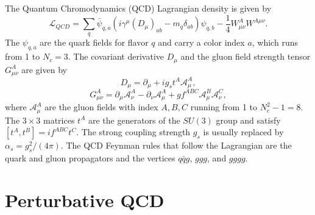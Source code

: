 The Quantum Chromodynamics (QCD) Lagrangian density is given by
%
\begin{equation}
\mathcal{L}_{QCD} =  \sum_q \bar{\psi}_{q,a} (i\gamma^{\mu} (D_{\mu})_{ab} - m_q \delta_{ab})\psi_{q,b} - \frac{1}{4} W^A_{\mu\nu}W^{A\mu\nu}. 
\end{equation}
%
The $\psi_{q,a}$ are the quark fields for flavor $q$ and carry a color index $a$, which runs from 1 to $N_c = 3$. The covariant derivative $D_{\mu}$ and the gluon field strength tensor $G^A_{\mu\nu}$ are given by
%
\begin{equation}
D_{\mu} = \partial_{\mu} + i g_s t^A \mathcal{A}^A_{\mu},
\end{equation}
%
\begin{equation}
G^A_{\mu\nu} = \partial_{\mu} \mathcal{A}^A_{\nu} - \partial_{\nu} \mathcal{A}^A_{\mu} + g f^{ABC} \mathcal{A}^B_{\mu} \mathcal{A}^C_{\nu},
\end{equation}
%
where $\mathcal{A}^A_{\mu}$ are the gluon fields with index $A, B, C$ running from 1 to $N^2_c - 1 = 8$. The $3 \times 3 $ matrices $t^A$ are the generators of the $SU(3)$ group and satisfy $[t^A,t^B]= if^{ABC} t^C$. The strong coupling strength $g_s$ is usually replaced by $\alpha_s = g^2_s/(4\pi)$. The QCD Feynman rules that follow the Lagrangian are the quark and gluon propagators and the vertices $q\bar{q}g$, $ggg$, and $gggg$.




\section{Perturbative QCD}\label{sec:qcd}


